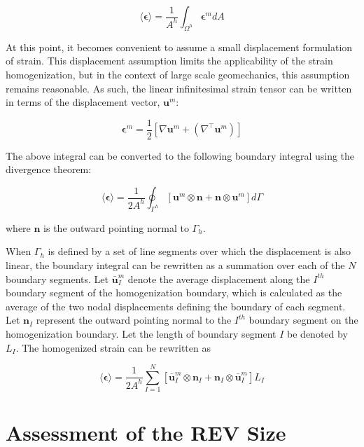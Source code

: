 \begin{equation}
\langle\boldsymbol{\epsilon}\rangle=\frac{1}{A^{h}}\int_{\Omega^{h}}\boldsymbol{\epsilon}^m dA\label{eqn:strain2}
\end{equation}

At this point, it becomes convenient to assume a small displacement formulation of strain. This displacement assumption limits the applicability of the strain homogenization, but in the context of large scale geomechanics, this assumption remains reasonable. As such, the linear infinitesimal strain tensor can be written in terms of the displacement vector, $\mathbf{u}^m$:

\begin{equation}
\boldsymbol{\epsilon}^m=\frac{1}{2}\left[\nabla\mathbf{u}^m+\left(\nabla^\top \mathbf{u}^m\right)\right]\label{eqn:strain1}
\end{equation}

The above integral can be converted to the following boundary integral using the divergence theorem:

\begin{equation}
\langle\boldsymbol{\epsilon}\rangle=\frac{1}{2A^{h}}\oint_{\Gamma^{h}}\left[\mathbf{u}^m\otimes\mathbf{n}+\mathbf{n}\otimes\mathbf{u}^m\right]d\Gamma\label{eqn:strain5-1}
\end{equation}

where $\mathbf{n}$ is the outward pointing normal to $\Gamma_h$.

When $\Gamma_h$ is defined by a set of line segments over which the displacement is also linear, the boundary integral can be rewritten as a summation over each of the $N$ boundary segments. Let $\bar{\mathbf{u}}^m_{I}$ denote the average displacement along the $I^{th}$ boundary segment of the homogenization boundary, which is calculated as the average of the two nodal displacements defining the boundary of each segment. Let $\mathbf{n}_{I}$ represent the outward pointing normal to the $I^{th}$ boundary segment on the homogenization boundary.  Let the length of boundary segment $I$ be denoted by $L_{I}$. The homogenized strain can be rewritten as

\begin{equation}
\langle\boldsymbol{\epsilon}\rangle=\frac{1}{2A^{h}}\sum_{I=1}^{N}\left[\bar{\mathbf{u}}^m_{I}\otimes\mathbf{n}_{I}+\mathbf{n}_{I}\otimes\bar{\mathbf{u}}^m_{I}\right]L_{I}\label{eqn:strain7}
\end{equation}


\section{Assessment of the REV Size}


